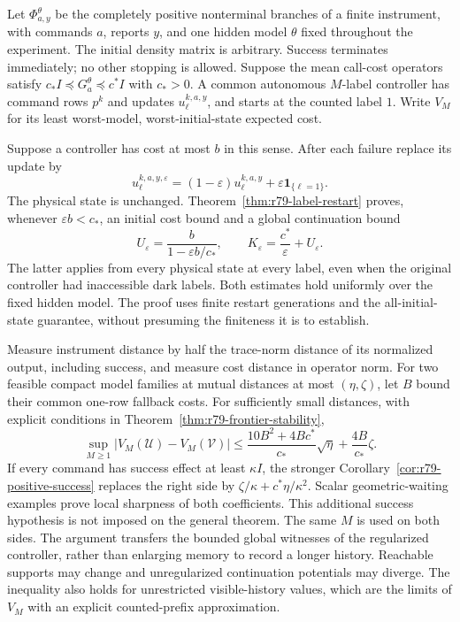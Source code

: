 Let $\Phi^\theta_{a,y}$ be the completely positive nonterminal branches
of a finite instrument, with commands $a$, reports $y$, and one hidden
model $\theta$ fixed throughout the experiment.  The initial density
matrix is arbitrary.  Success terminates immediately; no other stopping
is allowed.  Suppose the mean call-cost operators satisfy
$c_*I\preccurlyeq G^\theta_a\preccurlyeq c^*I$ with $c_*>0$.
A common autonomous $M$-label controller has command rows $p^k$ and
updates $u^{k,a,y}_\ell$, and starts at the counted label $1$.
Write $V_M$ for its least worst-model, worst-initial-state expected cost.

Suppose a controller has cost at most $b$ in this sense.  After each
failure replace its update by
\[
 u^{k,a,y,\varepsilon}_\ell
 =(1-\varepsilon)u^{k,a,y}_\ell+
                   \varepsilon\mathbf1_{\{\ell=1\}}.
\]
The physical state is unchanged.  Theorem~\ref{thm:r79-label-restart}
proves, whenever $\varepsilon b<c_*$, an initial cost bound and a
global continuation bound
\[
 U_\varepsilon=\frac{b}{1-\varepsilon b/c_*},\qquad
 K_\varepsilon=\frac{c^*}{\varepsilon}+U_\varepsilon.
\]
The latter applies from every physical state at every label, even when
the original controller had inaccessible dark labels.  Both estimates
hold uniformly over the fixed hidden model.  The proof uses finite
restart generations and the all-initial-state guarantee, without
presuming the finiteness it is to establish.

Measure instrument distance by half the trace-norm distance of its
normalized output, including success, and measure cost distance in
operator norm.  For two feasible compact model families at mutual
distances at most $(\eta,\zeta)$, let $B$ bound their common one-row
fallback costs.  For sufficiently small distances, with explicit
conditions in Theorem~\ref{thm:r79-frontier-stability},
\begin{equation}\label{eq:r79-intro-stability}
 \sup_{M\ge1}|V_M(\mathcal U)-V_M(\mathcal V)|
 \le \frac{10B^2+4Bc^*}{c_*}\sqrt\eta
                   +\frac{4B}{c_*}\zeta.
\end{equation}
If every command has success effect at least $\kappa I$, the stronger
Corollary~\ref{cor:r79-positive-success} replaces the right side by
$\zeta/\kappa+c^*\eta/\kappa^2$.  Scalar geometric-waiting examples
prove local sharpness of both coefficients.  This additional success
hypothesis is not imposed on the general theorem.
The same $M$ is used on both sides.  The argument transfers the bounded
global witnesses of the regularized controller, rather than enlarging
memory to record a longer history.  Reachable supports may change and
unregularized continuation potentials may diverge.  The inequality
also holds for unrestricted visible-history values, which are the
limits of $V_M$ with an explicit counted-prefix approximation.

